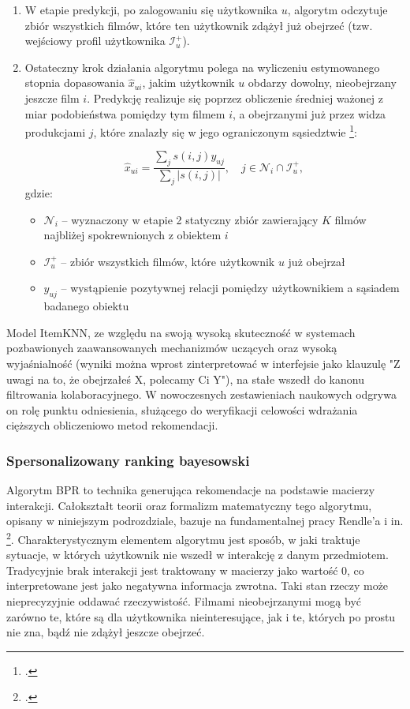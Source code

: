 \begin{enumerate}
    \item W etapie predykcji, po zalogowaniu się użytkownika $u$, algorytm odczytuje zbiór wszystkich filmów, które ten użytkownik zdążył już obejrzeć (tzw. wejściowy profil użytkownika $\mathcal{I}_u^+$).

    \item Ostateczny krok działania algorytmu polega na wyliczeniu estymowanego stopnia dopasowania $\hat{x}_{ui}$, jakim użytkownik $u$ obdarzy dowolny, nieobejrzany jeszcze film $i$. Predykcję realizuje się poprzez obliczenie średniej ważonej z miar podobieństwa pomiędzy tym filmem $i$, a obejrzanymi już przez widza produkcjami $j$, które znalazły się w jego ograniczonym sąsiedztwie \footcite[16]{balchanowskiEwolucyjnaAgregacjaRang2023}:

          \begin{equation}
              \hat{x}_{ui} = \frac{\sum_{j} s(i,j) y_{uj}}{\sum_{j} |s(i,j)|}, \quad j \in \mathcal{N}_i \cap \mathcal{I}_u^+,
          \end{equation}
          gdzie:
          \begin{itemize}
              \item $\mathcal{N}_i$ -- wyznaczony w etapie 2 statyczny zbiór zawierający $K$ filmów najbliżej spokrewnionych z obiektem $i$
              \item $\mathcal{I}_u^+$ -- zbiór wszystkich filmów, które użytkownik $u$ już obejrzał
              \item $y_{uj}$ -- wystąpienie pozytywnej relacji pomiędzy użytkownikiem a sąsiadem badanego obiektu
          \end{itemize}
\end{enumerate}

Model ItemKNN, ze względu na swoją wysoką skuteczność w systemach pozbawionych zaawansowanych mechanizmów uczących oraz wysoką wyjaśnialność (wyniki można wprost zinterpretować w interfejsie jako klauzulę "Z uwagi na to, że obejrzałeś X, polecamy Ci Y"), na stałe wszedł do kanonu filtrowania kolaboracyjnego. W nowoczesnych zestawieniach naukowych odgrywa on rolę punktu odniesienia, służącego do weryfikacji celowości wdrażania cięższych obliczeniowo metod rekomendacji.


\subsubsection{Spersonalizowany ranking bayesowski}

Algorytm BPR to technika generująca rekomendacje na podstawie macierzy interakcji. Całokształt teorii oraz formalizm matematyczny tego algorytmu, opisany w niniejszym podrozdziale, bazuje na fundamentalnej pracy Rendle'a i in. \footcite{rendleBPRBayesianPersonalized2009}. Charakterystycznym elementem algorytmu jest sposób, w jaki traktuje sytuacje, w których użytkownik nie wszedł w interakcję z danym przedmiotem. Tradycyjnie brak interakcji jest traktowany w macierzy jako wartość 0, co interpretowane jest jako negatywna informacja zwrotna. Taki stan rzeczy może nieprecyzyjnie oddawać rzeczywistość. Filmami nieobejrzanymi mogą być zarówno te, które są dla użytkownika nieinteresujące, jak i te, których po prostu nie zna, bądź nie zdążył jeszcze obejrzeć.

